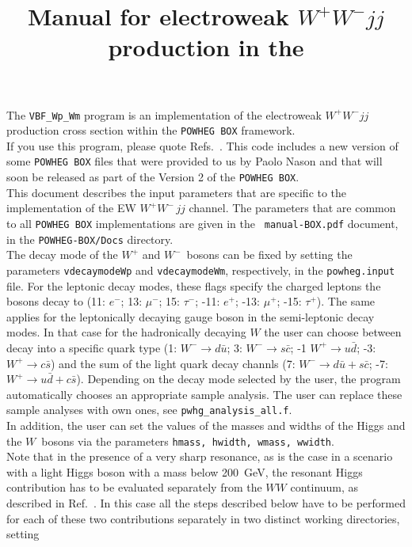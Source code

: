 \documentclass[a4paper,11pt]{article}
\title{Manual for electroweak $W^+W^- jj$ production in the \POWHEGBOX{}}
\date{}
\newcommand\POWHEGBOX{{\tt POWHEG BOX}}
\def\wpm{W^+W^-}
\def\pbox{{\tt POWHEG BOX}}
\begin{document}
\maketitle
%
\noindent
The {\tt VBF\_Wp\_Wm} program is an implementation of the electroweak
$W^+W^- jj$ production cross section within the \pbox{} framework. 
\\[2ex]
If you use this program, please quote
Refs.~\cite{Jager:2006zc,JZ,Alioli:2010xd}.
This code includes a new version of some \POWHEGBOX{} files that were
provided to us by Paolo Nason and that will soon be released as part
of the Version 2 of the \POWHEGBOX{}. 
\\[2ex]
This document describes the input parameters that are specific to the
implementation of the EW $\wpm\,jj$ channel.  The parameters that are
common to all {\tt POWHEG BOX} implementations are given in the {\tt
  manual-BOX.pdf} document, in the {\tt POWHEG-BOX/Docs} directory.
\\[2ex]
The decay mode of the $W^+$ and $W^-$~bosons can be fixed by setting
the parameters {\tt vdecaymodeWp} and {\tt vdecaymodeWm},
respectively, in the {\tt powheg.input} file. For the leptonic decay
modes, these flags specify the charged leptons the bosons decay to
(11: $e^-$; 13: $\mu^-$; 15: $\tau^-$; -11: $e^+$; -13: $\mu^+$; -15:
$\tau^+$). The same applies for the leptonically decaying gauge boson
in the semi-leptonic decay modes. In that case for the hadronically
decaying $W$ the user can choose between decay into a specific quark
type (1: $W^-\to d\bar u$; 3: $W^-\to s\bar c$; -1 $W^+\to u\bar d$;
-3: $W^+\to c\bar s$) and the sum of the light quark decay channls (7:
$W^-\to d\bar u + s\bar c$; -7: $W^+\to u\bar d + c\bar s$). 
%
Depending on the decay mode selected by the user, the program automatically chooses an appropriate sample analysis. The user can replace these sample analyses with own ones, see {\tt pwhg\_analysis\_all.f}. 
\\[2ex]
In addition, the user can set the values of the masses and widths of
the Higgs and the $W$~bosons via the parameters {\tt hmass, hwidth,
  wmass, wwidth}.
\\[2ex]
Note that 
in the presence of a very sharp resonance, as is the case in a
scenario with a light Higgs boson with a mass below 200~GeV, the
resonant Higgs contribution has to be evaluated separately from the
$WW$ continuum, as described in Ref.~\cite{JZ}. In this case all the
steps described below have to be performed for each of these two
contributions separately in two distinct working directories, setting
\end{document}

